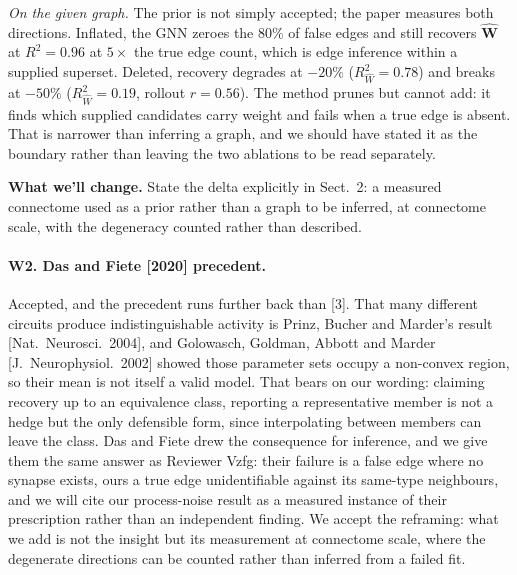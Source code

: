 \documentclass[11pt]{article}
\newcommand{\Rw}{R^2_{\widehat W}}
\newcommand{\Mat}[1]{\mathbf{#1}}
\begin{document}
\emph{On the given graph.} The prior is not simply accepted; the paper
measures both directions. Inflated, the GNN zeroes the $80\%$ of false edges and
still recovers $\widehat{\Mat{W}}$ at $R^2 = 0.96$ at $5\times$ the true edge
count, which is edge inference within a supplied superset. Deleted, recovery
degrades at $-20\%$ ($\Rw = 0.78$) and breaks at $-50\%$ ($\Rw = 0.19$, rollout
$r = 0.56$). The method prunes but cannot add: it finds which supplied candidates
carry weight and fails when a true edge is absent. That is narrower than
inferring a graph, and we should have stated it as the boundary rather than
leaving the two ablations to be read separately.

\textbf{What we'll change.} State the delta explicitly in Sect.~2: a measured
connectome used as a prior rather than a graph to be inferred, at connectome
scale, with the degeneracy counted rather than described.

\label{link13}
\paragraph{W2. Das and Fiete [2020] precedent.}
Accepted, and the precedent runs further back than [3]. That many different
circuits produce indistinguishable activity is Prinz, Bucher and Marder's result
[Nat.\ Neurosci.\ 2004], and Golowasch, Goldman, Abbott and Marder
[J.\ Neurophysiol.\ 2002] showed those parameter sets occupy a non-convex region,
so their mean is not itself a valid model. That bears on our wording: claiming
recovery up to an equivalence class, reporting a representative member is not a
hedge but the only defensible form, since interpolating between members can leave
the class. Das and Fiete drew the consequence for inference, and we give them the
same answer as Reviewer Vzfg: their failure is a false edge where no synapse
exists, ours a true edge unidentifiable against its same-type neighbours, and we
will cite our process-noise result as a measured instance of their prescription
rather than an independent finding. We accept the reframing: what we add is not
the insight but its measurement at connectome scale, where the degenerate
directions can be counted rather than inferred from a failed fit.
\end{document}
